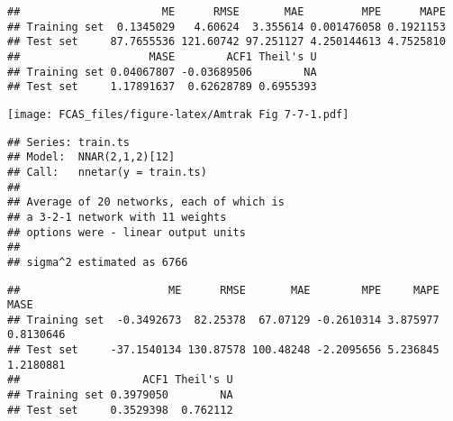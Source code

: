 \documentclass[]{article}
\begin{document}
\begin{verbatim}
##                      ME      RMSE       MAE         MPE      MAPE
## Training set  0.1345029   4.60624  3.355614 0.001476058 0.1921153
## Test set     87.7655536 121.60742 97.251127 4.250144613 4.7525810
##                    MASE        ACF1 Theil's U
## Training set 0.04067807 -0.03689506        NA
## Test set     1.17891637  0.62628789 0.6955393
\end{verbatim}

\texttt{[image: FCAS\_files/figure-latex/Amtrak Fig 7-7-1.pdf]}

\begin{verbatim}
## Series: train.ts 
## Model:  NNAR(2,1,2)[12] 
## Call:   nnetar(y = train.ts)
## 
## Average of 20 networks, each of which is
## a 3-2-1 network with 11 weights
## options were - linear output units 
## 
## sigma^2 estimated as 6766
\end{verbatim}

\begin{verbatim}
##                       ME      RMSE       MAE        MPE     MAPE      MASE
## Training set  -0.3492673  82.25378  67.07129 -0.2610314 3.875977 0.8130646
## Test set     -37.1540134 130.87578 100.48248 -2.2095656 5.236845 1.2180881
##                   ACF1 Theil's U
## Training set 0.3979050        NA
## Test set     0.3529398  0.762112
\end{verbatim}
\end{document}
